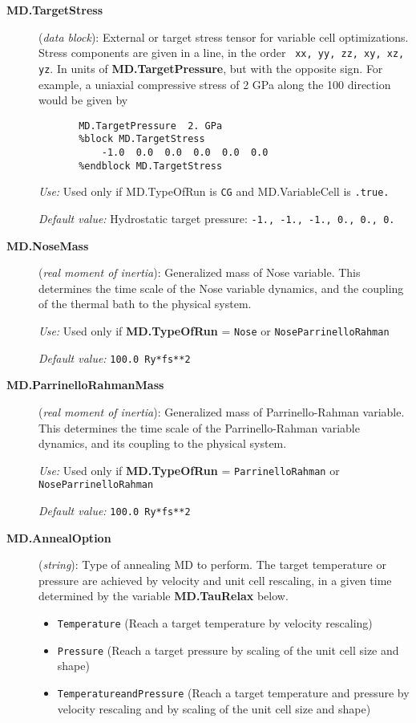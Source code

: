 \documentclass[11pt]{article}
\begin{document}
\begin{description}
\item[{\bf MD.TargetStress}] ({\it data block}):
External or target stress tensor for variable cell optimizations.
Stress components are given in a line, in the order {\tt
xx, yy, zz, xy, xz, yz}. In units of {\bf MD.TargetPressure},
but with the opposite sign. For example, a uniaxial compressive stress 
of 2 GPa along the 100 direction would be given by
\begin{verbatim}
       MD.TargetPressure  2. GPa
       %block MD.TargetStress
           -1.0  0.0  0.0  0.0  0.0  0.0
       %endblock MD.TargetStress
\end{verbatim}

{\it Use:} Used only if MD.TypeOfRun is {\tt CG} and 
MD.VariableCell is {\tt .true.} 
 
{\it Default value:} Hydrostatic target pressure: 
{\tt -1., -1., -1., 0., 0., 0.}



\item[{\bf MD.NoseMass}] ({\it real moment of inertia}): 
Generalized mass of Nose variable.
This determines the time scale of the Nose variable
dynamics, and the coupling of the thermal bath to
the physical system.

{\it Use:} Used only if {\bf MD.TypeOfRun} = {\tt Nose} or 
{\tt NoseParrinelloRahman}

{\it Default value:} {\tt 100.0 Ry*fs**2}

\item[{\bf MD.ParrinelloRahmanMass}] ({\it real moment of inertia}): 
Generalized mass of Parrinello-Rahman variable.
This determines the time scale 
of the Parrinello-Rahman variable
dynamics, and its coupling to
the physical system.

{\it Use:} Used only if {\bf MD.TypeOfRun} = {\tt ParrinelloRahman} 
or {\tt NoseParrinelloRahman}

{\it Default value:} {\tt 100.0 Ry*fs**2}

\item[{\bf MD.AnnealOption}] ({\it string}): 
Type of annealing MD to perform. The target temperature or pressure are
achieved by velocity and unit cell rescaling, 
in a given time determined by the variable
{\bf MD.TauRelax} below.
\begin{itemize}
\item {\tt Temperature} (Reach a target temperature by velocity rescaling)
\item {\tt Pressure} (Reach a target pressure by scaling of the unit
cell size and shape)
\item {\tt TemperatureandPressure}  (Reach a target temperature 
and pressure by velocity rescaling and by scaling of the unit
cell size and shape)
\end{itemize}


\end{description}
\end{document}
